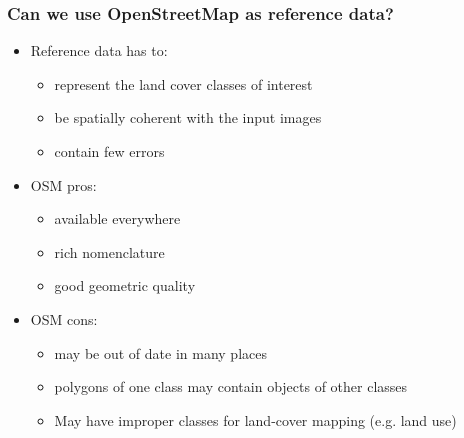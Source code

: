 \documentclass[8pt]{beamer}
\begin{document}
\begin{frame}
\frametitle{Can we use OpenStreetMap as reference data?}
\begin{itemize}
\item Reference data has to:
  \begin{itemize}
  \item represent the land cover classes of interest
  \item be spatially coherent with the input images
  \item contain few errors
  \end{itemize}
\item OSM pros:
  \begin{itemize}
  \item available everywhere
  \item rich nomenclature
  \item good geometric quality
  \end{itemize}
\item OSM cons:
  \begin{itemize}
  \item may be out of date in many places
  \item polygons of one class may contain objects of other classes
  \item May have improper classes for land-cover mapping (e.g. land use)
  \end{itemize}
\end{itemize}


\end{frame}
\end{document}
